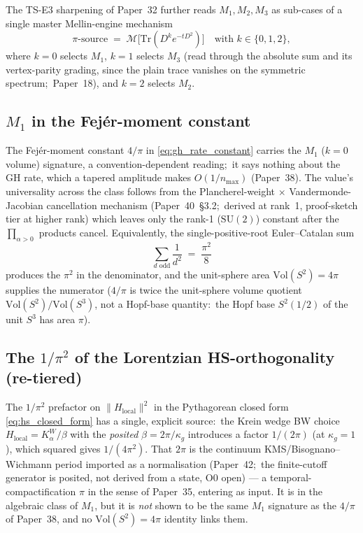 \documentclass[11pt,a4paper]{article}
\theoremstyle{plain}
\theoremstyle{definition}
\newcommand{\nmax}{n_{\max}}
\newcommand{\sthree}{S^{3}}
\newcommand{\SU}{\mathrm{SU}}
\newcommand{\Vol}{\mathrm{Vol}}
\newcommand{\Tr}{\mathrm{Tr}}
\begin{document}
The TS-E3 sharpening of Paper~32 further reads $M_{1}, M_{2},
M_{3}$ as sub-cases of a single master Mellin-engine mechanism
\begin{equation}
\pi\text{-source}
\;=\;
\mathcal{M}\bigl[ \Tr(D^{k} e^{-tD^{2}}) \bigr]
\quad \text{with } k \in \{0, 1, 2\},
\label{eq:master_mellin_engine}
\end{equation}
where $k = 0$ selects $M_{1}$, $k = 1$ selects $M_{3}$ (read through the
absolute sum and its vertex-parity grading, since the plain trace
vanishes on the symmetric spectrum;\ Paper~18), and $k = 2$ selects $M_{2}$.

\subsection{$M_{1}$ in the Fej\'er-moment constant}

The Fej\'er-moment constant $4/\pi$ in \eqref{eq:gh_rate_constant} carries the
$M_{1}$ ($k = 0$ volume) signature, a convention-dependent reading;\ it says
nothing about the GH rate, which a tapered amplitude makes $O(1/\nmax)$
(Paper~38).
The value's universality across the class follows from the
Plancherel-weight $\times$ Vandermonde-Jacobian cancellation mechanism (Paper~40~\S 3.2;\
derived at rank~1, proof-sketch tier at higher rank) which
leaves only the rank-1 ($\SU(2)$) constant after the
$\prod_{\alpha > 0}$ products cancel.  Equivalently, the
single-positive-root Euler--Catalan sum
\begin{equation*}
\sum_{d \text{ odd}} \frac{1}{d^{2}} \;=\; \frac{\pi^{2}}{8}
\end{equation*}
produces the $\pi^{2}$ in the denominator, and the unit-sphere area
$\Vol(S^{2}) = 4\pi$ supplies the numerator ($4/\pi$ is twice the
unit-sphere volume quotient $\Vol(S^2)/\Vol(\sthree)$, not a Hopf-base
quantity:\ the Hopf base $S^{2}(1/2)$ of the
unit $\sthree$ has area $\pi$).

\subsection{The $1/\pi^{2}$ of the Lorentzian HS-orthogonality (re-tiered)}

The $1/\pi^{2}$ prefactor on $\|H_{\mathrm{local}}\|^{2}$ in the
Pythagorean closed form \eqref{eq:hs_closed_form} has a single, explicit
source:\ the Krein wedge BW choice $H_{\mathrm{local}} =
K_{\alpha}^{W}/\beta$ with the \emph{posited} $\beta = 2\pi/\kappa_g$
introduces a factor $1/(2\pi)$ (at $\kappa_g = 1$), which squared gives
$1/(4\pi^{2})$.  That $2\pi$ is the continuum KMS/Bisognano--Wichmann
period imported as a normalisation (Paper~42;\ the finite-cutoff generator
is posited, not derived from a state, O0 open) --- a
temporal-compactification $\pi$ in the sense of Paper~35, entering as
input.  It is in the algebraic class of $M_1$, but it is \emph{not} shown
to be the same $M_{1}$ signature as the $4/\pi$ of Paper~38, and no
$\Vol(S^{2}) = 4\pi$ identity links them.
\end{document}
